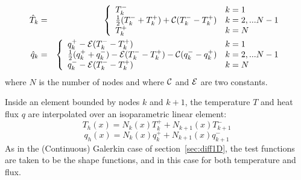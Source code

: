\begin{eqnarray}
\hat{T}_k &=&
\left\{
\begin{array}{ll}
T_k^-   & k=1 \\ 
\frac{1}{2}(T_k^-+T_k^+) + {\cal C} (T_k^- - T_k^+) & k=2,...N-1\\
T_k^+    & k=N \\ 
\end{array}
\right. \nonumber\\
\hat{q}_k &=&
\left\{
\begin{array}{ll}
q_k^+ -{\cal E} (T_k^--T_k^+)  & k=1 \\ 
\frac{1}{2}(q_k^+ + q_k^-) - {\cal E} (T_k^- - T_k^+) - {\cal C}(q_k^- - q_k^+) & k=2,...N-1\\
q_k^- -{\cal E} (T_k^--T_k^+)    & k=N \\ 
\end{array}
\right.
\end{eqnarray}
where $N$ is the number of nodes and where ${\cal C}$ and ${\cal E}$ are two constants. 

Inside an element bounded by nodes $k$ and $k+1$, 
the temperature $T$ and heat flux $q$ are interpolated over an isoparametric linear element:
\[
T_h(x) = N_k(x) T_k^+ + N_{k+1}(x)T_{k+1}^-
\]
\[
q_h(x) = N_k(x) q_k^+ + N_{k+1}(x)q_{k+1}^-
\]
As in the (Continuous) Galerkin case of section~\ref{sec:diff1D}, the test functions are taken to 
be the shape functions, and in this case for both temperature and flux. 


